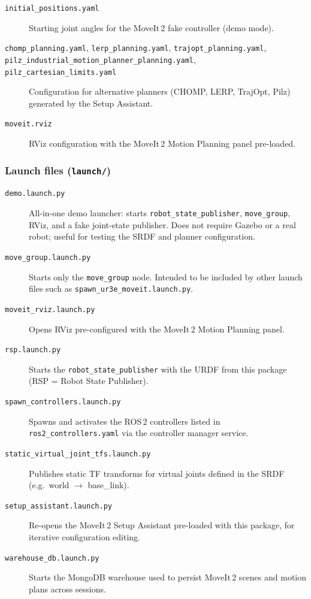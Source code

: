 \documentclass[11pt,a4paper]{article}
\newcommand{\file}[1]{\texttt{#1}}
\begin{document}
\begin{description}
  \item[\file{initial\_positions.yaml}]
    Starting joint angles for the MoveIt\,2 fake controller (demo mode).

  \item[\file{chomp\_planning.yaml}, \file{lerp\_planning.yaml}, \file{trajopt\_planning.yaml}, \file{pilz\_industrial\_motion\_planner\_planning.yaml}, \file{pilz\_cartesian\_limits.yaml}]
    Configuration for alternative planners (CHOMP, LERP, TrajOpt, Pilz)
    generated by the Setup Assistant.

  \item[\file{moveit.rviz}]
    RViz configuration with the MoveIt\,2 Motion Planning panel pre-loaded.
\end{description}

\subsubsection{Launch files (\file{launch/})}

\begin{description}
  \item[\file{demo.launch.py}]
    All-in-one demo launcher: starts \texttt{robot\_state\_publisher},
    \texttt{move\_group}, RViz, and a fake joint-state publisher.
    Does not require Gazebo or a real robot; useful for testing the SRDF and
    planner configuration.

  \item[\file{move\_group.launch.py}]
    Starts only the \texttt{move\_group} node. Intended to be included by
    other launch files such as \file{spawn\_ur3e\_moveit.launch.py}.

  \item[\file{moveit\_rviz.launch.py}]
    Opens RViz pre-configured with the MoveIt\,2 Motion Planning panel.

  \item[\file{rsp.launch.py}]
    Starts the \texttt{robot\_state\_publisher} with the URDF from this
    package (RSP = Robot State Publisher).

  \item[\file{spawn\_controllers.launch.py}]
    Spawns and activates the ROS\,2 controllers listed in
    \file{ros2\_controllers.yaml} via the controller manager service.

  \item[\file{static\_virtual\_joint\_tfs.launch.py}]
    Publishes static TF transforms for virtual joints defined in the SRDF
    (e.g.\ world $\to$ base\_link).

  \item[\file{setup\_assistant.launch.py}]
    Re-opens the MoveIt\,2 Setup Assistant pre-loaded with this package,
    for iterative configuration editing.

  \item[\file{warehouse\_db.launch.py}]
    Starts the MongoDB warehouse used to persist MoveIt\,2 scenes and motion
    plans across sessions.
\end{description}
\end{document}
